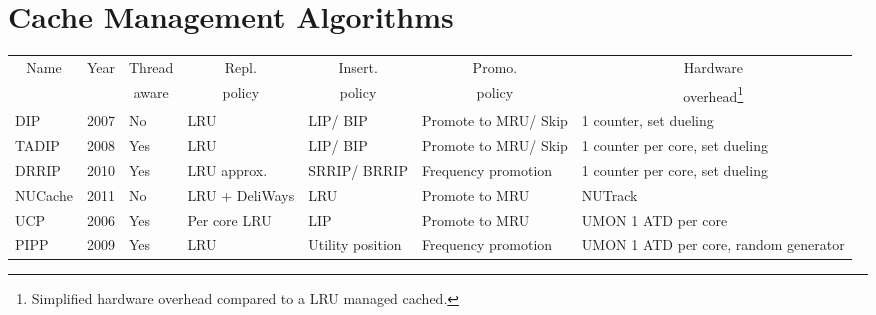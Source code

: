 
\chapter{Cache Management Algorithms}
\label{cpt:algorithms}

\begin{table}[htb]
\begin{tabular}{|p{1.0cm}|p{0.5cm}|p{0.8cm}|p{1.2cm}|p{1.2cm}|p{1.2cm}|p{1.2cm}|}
\hline
\multicolumn{1}{|c|}{Name} & \multicolumn{1}{c|}{Year} & \multicolumn{1}{c|}{Thread} & \multicolumn{1}{c|}{Repl.} & \multicolumn{1}{c|}{Insert.} & \multicolumn{1}{c|}{Promo.} & \multicolumn{1}{c|}{Hardware}         \\
\multicolumn{1}{|c|}{}          & \multicolumn{1}{c|}{}          & \multicolumn{1}{c|}{aware}  & \multicolumn{1}{c|}{policy}      & \multicolumn{1}{c|}{policy}    & \multicolumn{1}{c|}{policy}    & \multicolumn{1}{c|}{overhead\footnote{Simplified hardware overhead compared to a LRU managed cached.}}         \\ \hline
DIP                             & 2007                           & No                          & LRU                              & LIP/ BIP                        & Promote to MRU/ Skip            & 1 counter, set dueling                \\ \hline
TADIP                           & 2008                           & Yes                         & LRU                              & LIP/ BIP                        & Promote to MRU/ Skip            & 1 counter per core, set dueling           \\ \hline
DRRIP                           & 2010                           & Yes                         & LRU approx.                      & SRRIP/ BRRIP                    & Frequency promotion            & 1 counter per core, set dueling           \\ \hline
NUCache                         & 2011                           & No                          & LRU + DeliWays     & LRU                            & Promote to MRU                 & NUTrack                               \\ \hline
UCP                             & 2006                           & Yes                         & Per core LRU                     & LIP                            & Promote to MRU                 & UMON 1 ATD per core                   \\ \hline
PIPP                            & 2009                           & Yes                         & LRU                              & Utility position               & Frequency promotion            & UMON 1 ATD per core, random generator \\ \hline

\end{tabular}
\end{table}
